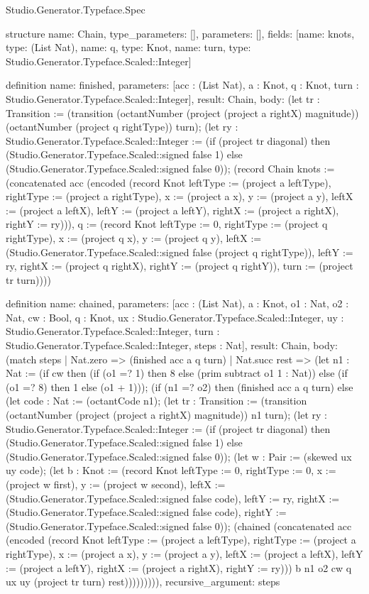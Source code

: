 \begin{lexlean}{Studio.Generator.Typeface.Spec}
\begin{semanticmodule}
structure{
  name: Chain,
  type_parameters: [],
  parameters: [],
  fields: [{name: knots, type: (List Nat)}, {name: q, type: Knot}, {name: turn, type: Studio.Generator.Typeface.Scaled::Integer}]
}

definition{
  name: finished,
  parameters: [acc : (List Nat), a : Knot, q : Knot, turn : Studio.Generator.Typeface.Scaled::Integer],
  result: Chain,
  body: (let tr : Transition := (transition (octantNumber (project (project a rightX) magnitude)) (octantNumber (project q rightType)) turn); (let ry : Studio.Generator.Typeface.Scaled::Integer := (if (project tr diagonal) then (Studio.Generator.Typeface.Scaled::signed false 1) else (Studio.Generator.Typeface.Scaled::signed false 0)); (record Chain {knots := (concatenated acc (encoded (record Knot {leftType := (project a leftType), rightType := (project a rightType), x := (project a x), y := (project a y), leftX := (project a leftX), leftY := (project a leftY), rightX := (project a rightX), rightY := ry}))), q := (record Knot {leftType := 0, rightType := (project q rightType), x := (project q x), y := (project q y), leftX := (Studio.Generator.Typeface.Scaled::signed false (project q rightType)), leftY := ry, rightX := (project q rightX), rightY := (project q rightY)}), turn := (project tr turn)})))
}

definition{
  name: chained,
  parameters: [acc : (List Nat), a : Knot, o1 : Nat, o2 : Nat, cw : Bool, q : Knot, ux : Studio.Generator.Typeface.Scaled::Integer, uy : Studio.Generator.Typeface.Scaled::Integer, turn : Studio.Generator.Typeface.Scaled::Integer, steps : Nat],
  result: Chain,
  body: (match steps
    | Nat.zero => (finished acc a q turn)
    | Nat.succ rest => (let n1 : Nat := (if cw then (if (o1 =? 1) then 8 else (prim subtract o1 1 : Nat)) else (if (o1 =? 8) then 1 else (o1 + 1))); (if (n1 =? o2) then (finished acc a q turn) else (let code : Nat := (octantCode n1); (let tr : Transition := (transition (octantNumber (project (project a rightX) magnitude)) n1 turn); (let ry : Studio.Generator.Typeface.Scaled::Integer := (if (project tr diagonal) then (Studio.Generator.Typeface.Scaled::signed false 1) else (Studio.Generator.Typeface.Scaled::signed false 0)); (let w : Pair := (skewed ux uy code); (let b : Knot := (record Knot {leftType := 0, rightType := 0, x := (project w first), y := (project w second), leftX := (Studio.Generator.Typeface.Scaled::signed false code), leftY := ry, rightX := (Studio.Generator.Typeface.Scaled::signed false code), rightY := (Studio.Generator.Typeface.Scaled::signed false 0)}); (chained (concatenated acc (encoded (record Knot {leftType := (project a leftType), rightType := (project a rightType), x := (project a x), y := (project a y), leftX := (project a leftX), leftY := (project a leftY), rightX := (project a rightX), rightY := ry}))) b n1 o2 cw q ux uy (project tr turn) rest))))))))),
  recursive_argument: steps
}


\end{semanticmodule}
\end{lexlean}
